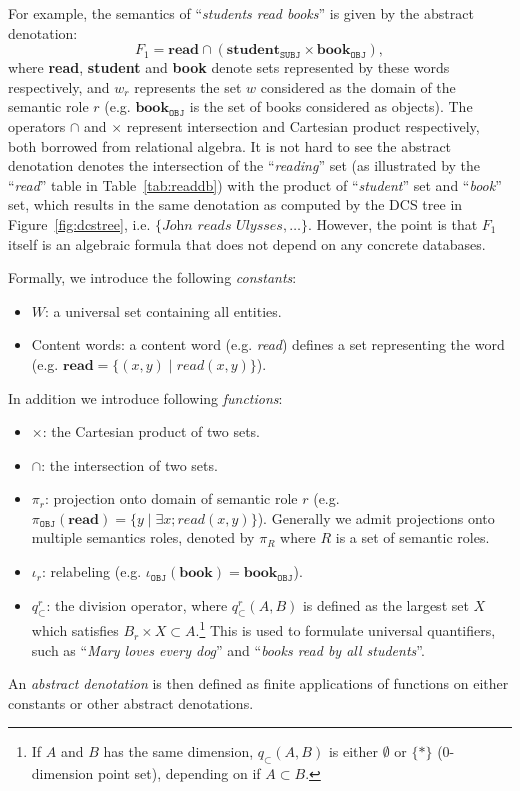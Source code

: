 \documentclass[11pt]{article}
\begin{document}
For example, the semantics of ``\emph{students read books}'' is
given by the abstract denotation:
$$
F_1=\textbf{read}\cap
(\textbf{student}_{\texttt{SUBJ}}\times \textbf{book}_{\texttt{OBJ}}),
$$
where \textbf{read}, \textbf{student} and \textbf{book} denote sets
represented by these words respectively, and $w_r$ represents the set
$w$ considered as the domain of the semantic role $r$ (e.g. $\textbf{book}_{\texttt{OBJ}}$ is 
the set of books considered as objects).  The operators
$\cap$ and $\times$ represent intersection and Cartesian product
respectively, both borrowed from relational algebra. 
It is not hard to see the abstract denotation denotes the intersection of the 
``\emph{reading}'' set (as illustrated by the ``\emph{read}'' table in Table~\ref{tab:readdb}) 
with the product of ``\emph{student}'' set and ``\emph{book}'' set,  
which results in the same denotation as computed by the DCS tree in Figure~\ref{fig:dcstree}, 
i.e. $\{\textit{John reads Ulysses},\ldots\}$. However, the point is that 
$F_1$ itself is an algebraic formula that does not depend on any concrete databases.

Formally, we introduce the following \emph{constants}:
\begin{itemize}
\item $W$: a universal set containing all entities. 
\item Content words: a content word (e.g. \textit{read}) defines a set 
representing the word (e.g. $\textbf{read}\!=\!\{(x,y)\;|\;read(x,y)\}$). 
\end{itemize}

In addition we introduce following \emph{functions}:
\begin{itemize}
\item $\times$: the Cartesian product of two sets.
\item $\cap$: the intersection of two sets.
\item $\pi_r$: projection onto domain of semantic role $r$ (e.g. 
$\pi_{\texttt{OBJ}}(\textbf{read})\!=\!\{y\;|\;\exists x;read(x,y)\}$). Generally 
we admit projections onto multiple semantics roles, denoted by $\pi_R$ where $R$ is 
a set of semantic roles. 
\item $\iota_r$: relabeling (e.g. $\iota_{\texttt{OBJ}}(\textbf{book})=\textbf{book}_{\texttt{OBJ}}$). 
\item $q_{\subset}^{r}$: the division operator, where $q_{\subset}^{r}(A,B)$ is defined as the 
largest set $X$ which satisfies $B_r\times X\subset A$.\footnote{If $A$ and $B$ has 
the same dimension, $q_{\subset}(A,B)$ is either $\emptyset$ or $\{*\}$ ($0$-dimension point set), 
depending on if $A\subset B$.} 
This is used to formulate universal quantifiers, such as 
``\textit{Mary loves every dog}'' and ``\textit{books read by all students}''. 
\end{itemize}
An \emph{abstract denotation} is then defined as finite applications of functions on either constants 
or other abstract denotations. 
\end{document}
